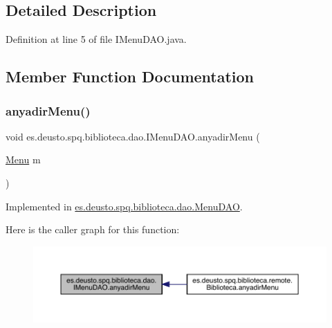 \subsection{Detailed Description}


Definition at line 5 of file I\+Menu\+D\+A\+O.\+java.



\subsection{Member Function Documentation}
\mbox{\label{interfacees_1_1deusto_1_1spq_1_1biblioteca_1_1dao_1_1_i_menu_d_a_o_a1c99a228f8d92ef41cbd3c4aae426eb0}} 
\subsubsection{\texorpdfstring{anyadir\+Menu()}{anyadirMenu()}}
{\footnotesize\ttfamily void es.\+deusto.\+spq.\+biblioteca.\+dao.\+I\+Menu\+D\+A\+O.\+anyadir\+Menu (\begin{DoxyParamCaption}\item[{\mbox{\hyperlink{classes_1_1deusto_1_1spq_1_1biblioteca_1_1data_1_1_menu}{Menu}}}]{m }\end{DoxyParamCaption})}



Implemented in \mbox{\hyperlink{classes_1_1deusto_1_1spq_1_1biblioteca_1_1dao_1_1_menu_d_a_o_af7d7568033bc78af220f0fd5cf4a71b6}{es.\+deusto.\+spq.\+biblioteca.\+dao.\+Menu\+D\+AO}}.

Here is the caller graph for this function\+:
\nopagebreak
\begin{figure}[H]
\begin{center}
\leavevmode
\includegraphics[width=350pt]{interfacees_1_1deusto_1_1spq_1_1biblioteca_1_1dao_1_1_i_menu_d_a_o_a1c99a228f8d92ef41cbd3c4aae426eb0_icgraph}
\end{center}
\end{figure}
\mbox{\label{interfacees_1_1deusto_1_1spq_1_1biblioteca_1_1dao_1_1_i_menu_d_a_o_abd65ad2c5269cd19edc975518bf16b49}} 
